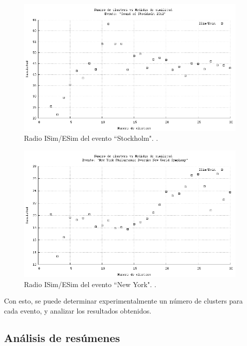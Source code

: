 \documentclass[upright, contnum]{umemoria}
\begin{document}
\begin{figure}[h]
  \centering
  \includegraphics[width=14cm]{./img/stockholm-clusters-radio.png}
  \caption[Radios de similitud para evento 3]
   { Radio ISim/ESim del evento ``Stockholm". \label{fig:stockholm-radio}. }
\end{figure}

\begin{figure}[h]
  \centering
  \includegraphics[width=14cm]{./img/dvorak-clusters-radio.png}
  \caption[Radios de similitud para evento 4]
   { Radio ISim/ESim del evento ``New York". \label{fig:dvorak-radio}. }
\end{figure}

Con esto, se puede determinar experimentalmente un número de clusters
para cada evento, y analizar los resultados obtenidos.

\subsection{Análisis de resúmenes}
\label{sec-4.4.3}
\end{document}
